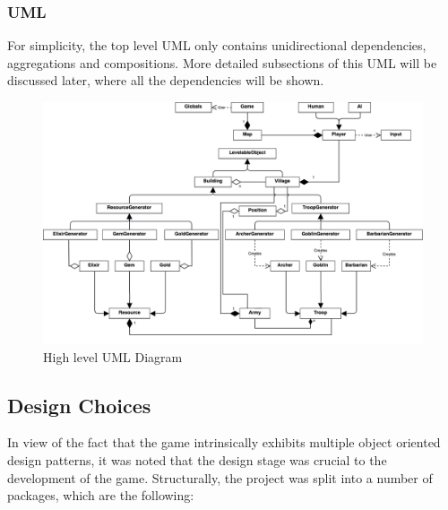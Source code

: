 \documentclass{article}
\begin{document}
\subsubsection{UML}

For simplicity, the top level UML only contains unidirectional dependencies, aggregations and compositions.
More detailed subsections of this UML will be discussed later, where all the dependencies will be shown.

\vspace{3em}
\begin{figure}[h]
	\centering
	\includegraphics[width=1\textwidth]{images/coc-uml.png}
	\caption{High level UML Diagram}
\end{figure}

\newpage

\subsection{Design Choices}

In view of the fact that the game intrinsically exhibits multiple object oriented design 
patterns, it was noted that the design stage was crucial to the development of the game. Structurally,
the project was split into a number of packages, which are the following:
\end{document}
